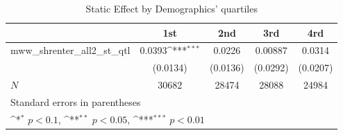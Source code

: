 \begin{table}[htbp]\centering
\def\sym#1{\ifmmode^{#1}\else\(^{#1}\)\fi}
\caption{Static Effect by Demographics' quartiles}
\begin{tabular}{l*{4}{c}}
\hline\hline
            &\multicolumn{1}{c}{1st}&\multicolumn{1}{c}{2nd}&\multicolumn{1}{c}{3rd}&\multicolumn{1}{c}{4rd}\\
\hline
mww\_shrenter\_all2\_st\_qtl&      0.0393\sym{***}&      0.0226         &     0.00887         &      0.0314         \\
            &    (0.0134)         &    (0.0136)         &    (0.0292)         &    (0.0207)         \\
\hline
\(N\)       &       30682         &       28474         &       28088         &       24984         \\
\hline\hline
\multicolumn{5}{l}{\footnotesize Standard errors in parentheses}\\
\multicolumn{5}{l}{\footnotesize \sym{*} \(p<0.1\), \sym{**} \(p<0.05\), \sym{***} \(p<0.01\)}\\
\end{tabular}
\end{table}
